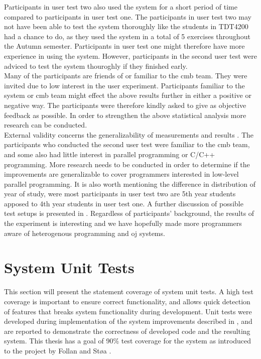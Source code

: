 Participants in user test two also used the system for a short period of time compared to participants in user test one. The participants in user test two may not have been able to test the system thoroughly like the students in TDT4200 had a chance to do, as they used the system in a total of 5 exercises throughout the Autumn semester. Participants in user test one might therefore have more experience in using the system. However, participants in the second user test were adviced to test the system thouroghly if they finished early.\\

Many of the participants are friends of or familiar to the \gls{cmb} team. They were invited due to low interest in the user experiment. Participants familiar to the system or \gls{cmb} team might effect the above results further in either a positive or negative way. The participants were therefore kindly asked to give as objective feedback as possible. In order to strengthen the above statistical analysis more research can be conducted. \\

External validity concerns the generalizability of measurements and results \cite{Oates2006}. The participants who conducted the second user test were familiar to the \gls{cmb} team, and some also had little interest in parallel programming or C/C++ programming. More research needs to be conducted in order to determine if the improvements are generalizable to cover programmers interested in low-level parallel programming. It is also worth mentioning the difference in distribution of year of study, were most participants in user test two are 5th year students apposed to 4th year students in user test one. A further discussion of possible test setups is presented in . Regardless of participants' background, the results of the experiment is interesting and we have hopefully made more programmers aware of heterogenous programming and \gls{oj} systems. \\

\section{System Unit Tests}
This section will present the statement coverage of system unit tests. A high test coverage is important to ensure correct functionality, and allows quick detection of features that breaks system functionality during development. Unit tests were developed during implementation of the system improvements described in , and are reported to demonstrate the correctness of developed code and the resulting system. This thesis has a goal of 90\% test coverage for the system as introduced to the project by Follan and Støa \cite{mt:T&S}. \\

